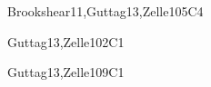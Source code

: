 \begin{syllabus}
\begin{unit}{\SPHistory}{}{Brookshear11,Guttag13,Zelle10}{5}{C4}
    \begin{learningoutcomes}
        \item \SPHistoryLOIdentifySignificant [\Familiarity]
        \item \SPHistoryLOIdentifyTheSeveral [\Familiarity]
        \item \SPHistoryLODiscussTheForLanguage [\Familiarity]
        \item \SPHistoryLOCompareDaily [\Assessment] 
    \end{learningoutcomes}
\end{unit}

\begin{unit}{\PLBasicTypeSystems}{}{Guttag13,Zelle10}{2}{C1}
    \begin{topics}
        \item \PLBasicTypeSystemsTopicA
        \item \PLBasicTypeSystemsTopicAssociation
		\item \PLBasicTypeSystemsTopicType
    \end{topics}

    \begin{learningoutcomes}  
		\item \PLBasicTypeSystemsLOForBoth [\Familiarity]  
		\item \PLBasicTypeSystemsLOForA [\Familiarity]
		\item \PLBasicTypeSystemsLODescribeExamples [\Familiarity]
		\item \PLBasicTypeSystemsLOForMultiple [\Usage] 
		\item \PLBasicTypeSystemsLOUseTypes [\Usage] 
		\item \PLBasicTypeSystemsLODefineAndPieces [\Usage] 
    \end{learningoutcomes}
\end{unit}

\begin{unit}{\SDFFundamentalProgrammingConcepts}{}{Guttag13,Zelle10}{9}{C1}
    \begin{topics}
        \item \SDFFundamentalProgrammingConceptsTopicBasic
        \item \SDFFundamentalProgrammingConceptsTopicVariables
        \item \SDFFundamentalProgrammingConceptsTopicExpressions
        \item \SDFFundamentalProgrammingConceptsTopicSimple
        \item \SDFFundamentalProgrammingConceptsTopicConditional
        \item \SDFFundamentalProgrammingConceptsTopicFunctions
        \item \SDFFundamentalProgrammingConceptsTopicThe
    \end{topics}


\end{unit}
\end{syllabus}
